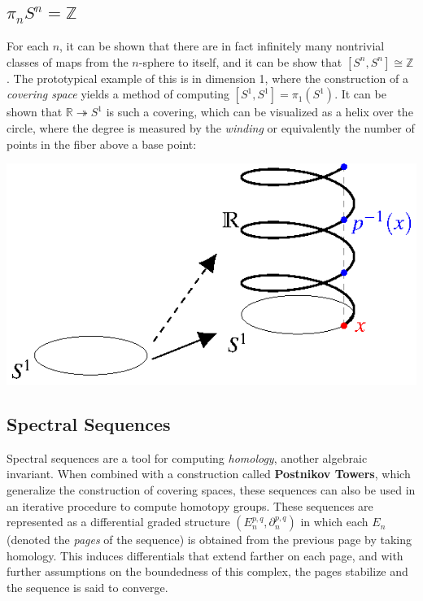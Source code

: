 \documentclass[a0,final]{a0poster}
\begin{document}
\begin{multicols}{3}
\subsection*{$\pi_{n} S^n = \mathbb{Z}$}

For each $n$, it can be shown that there are in fact infinitely many nontrivial classes of maps from the $n$-sphere to itself, and it can be show that $[S^n, S^n] \cong \mathbb{Z}$. The prototypical example of this is in dimension 1, where the construction of a \textit{covering space} yields a method of computing $[S^1, S^1] = \pi_1(S^1)$. It can be shown that $\mathbb{R} \twoheadrightarrow S^1$ is such a covering, which can be visualized as a helix over the circle, where the degree is measured by the \textit{winding} or equivalently the number of points in the fiber above a base point:


\begin{center}
\includegraphics[width=20cm]{helix}
\end{center}


\subsection*{Spectral Sequences}
Spectral sequences are a tool for computing \textit{homology}, another algebraic invariant. When combined with a construction called \textbf{Postnikov Towers}, which generalize the construction of covering spaces, these sequences can also be used in an iterative procedure to compute homotopy groups. These sequences are represented as a differential graded structure $(E_n^{p,q}, \partial_n^{p,q})$ in which each $E_n$ (denoted the \textit{pages} of the sequence) is obtained from the previous page by taking homology. This induces differentials that extend farther on each page, and with further assumptions on the boundedness of this complex, the pages stabilize and the sequence is said to converge.



\end{multicols}
\end{document}
